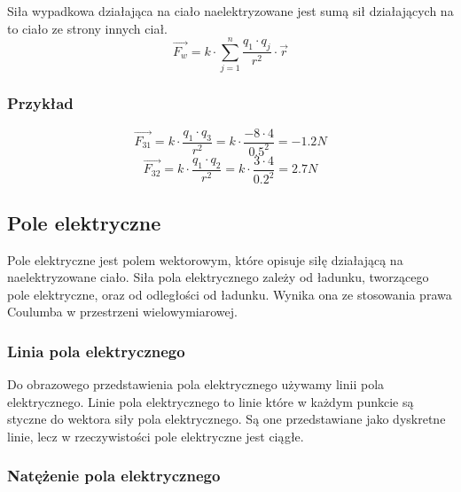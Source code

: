 \documentclass{../notatki}
\begin{document}
Siła wypadkowa działająca na ciało naelektryzowane jest sumą sił
działających na to ciało ze strony innych ciał.
$$
\vec{F_w} = k \cdot \sum_{j=1}^{n} \frac{q_1 \cdot q_j}{r^2} \cdot \vec{r}
$$

\subsubsection{Przykład}

\begin{figure}[h]
  \centering
\end{figure}
$$
\vec{F_{31}} = k \cdot \frac{q_1 \cdot q_3}{r^2} = k \cdot \frac{-8\cdot
4}{0.5^2} = -1.2 N
$$
$$
\vec{F_{32}} = k \cdot \frac{q_1 \cdot q_2}{r^2} = k \cdot \frac{3\cdot
4}{0.2^2} = 2.7 N
$$

\subsection{Pole elektryczne}

Pole elektryczne jest polem wektorowym, które opisuje siłę działającą na
naelektryzowane ciało. Siła pola elektrycznego zależy od ładunku,
tworzącego pole elektryczne, oraz od odległości od ładunku. Wynika
ona ze stosowania prawa Coulumba w przestrzeni wielowymiarowej.

\subsubsection{Linia pola elektrycznego}

Do obrazowego przedstawienia pola elektrycznego używamy linii pola
elektrycznego. Linie pola elektrycznego to linie które w każdym punkcie są
styczne do wektora siły pola elektrycznego. Są one przedstawiane jako dyskretne
linie, lecz w rzeczywistości pole elektryczne jest ciągłe.

\subsubsection{Natężenie pola elektrycznego}
\end{document}
